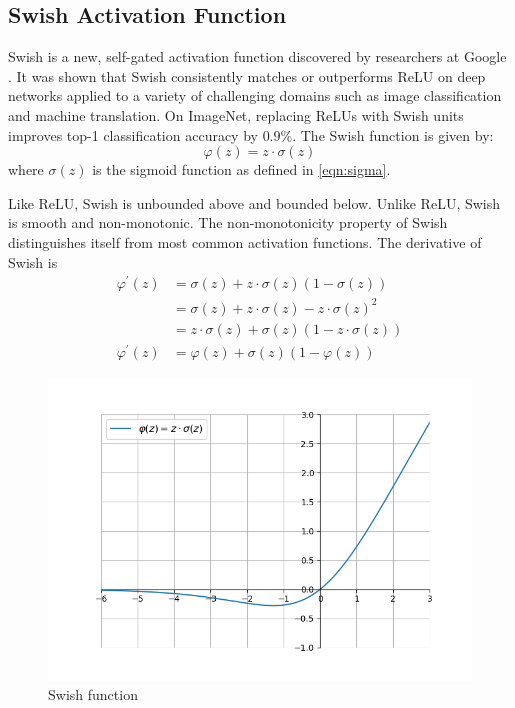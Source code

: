 \documentclass[12pt]{report}
\numberwithin{equation}{section}
\begin{document}
\subsection{Swish Activation Function}
Swish is a new, self-gated activation function discovered by researchers at Google \textbf{\cite{DBLP:journals/corr/abs-1710-05941}}. It was shown that Swish consistently matches or outperforms ReLU on deep networks applied to a variety of challenging domains such as image classification and machine translation. On ImageNet, replacing ReLUs with Swish units improves top-1 classification accuracy by $0.9\%$. The Swish function is given by:
\begin{equation}\label{eqn:swish}
\varphi(z) = z\cdot\sigma(z)
\end{equation}
where $\sigma(z)$ is the sigmoid function as defined in \eqref{eqn:sigma}.

Like ReLU, Swish is unbounded above and bounded below. Unlike ReLU, Swish is smooth and non-monotonic. The non-monotonicity property of Swish distinguishes itself from most common activation functions. The derivative of Swish is
\begin{equation}\label{eqn:swish_prime}
\begin{split}
\varphi^{\prime}(z) &=\sigma(z)+ z \cdot \sigma(z)(1-\sigma(z)) \\
	&=\sigma(z)+z \cdot \sigma(z)-z \cdot \sigma(z)^{2} \\
	&=z \cdot \sigma(z)+\sigma(z)(1-z \cdot \sigma(z)) \\
\varphi^{\prime}(z)	&=\varphi(z)+\sigma(z)(1-\varphi(z))
\end{split}
\end{equation}
\begin{figure}[htb!]
\centering 
\includegraphics[scale=0.9]{png/swish.png} 
\caption{Swish function}
\label{fig:swish}
\end{figure}
\end{document}
